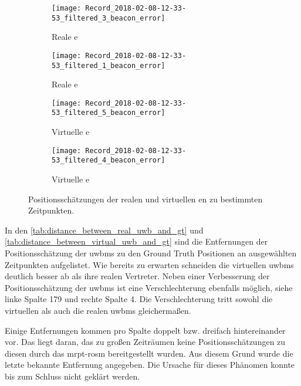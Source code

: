 \begin{figure}
	\centering
	\begin{subfigure}{0.49\linewidth}
		\centering
		\texttt{[image: Record\_2018-02-08-12-33-53\_filtered\_3\_beacon\_error]}
		\caption{Reale e}
		\label{fig:Record_2018-02-08-12-33-53_filtered_3_beacon_error}
	\end{subfigure}
	\hfill
	\begin{subfigure}{0.49\linewidth}
		\centering
		\texttt{[image: Record\_2018-02-08-12-33-53\_filtered\_1\_beacon\_error]}
		\caption{Reale e}
		\label{fig:Record_2018-02-08-12-33-53_filtered_1_beacon_error}
	\end{subfigure}
	\par
	\bigskip
	\begin{subfigure}{0.49\linewidth}
		\centering
		\texttt{[image: Record\_2018-02-08-12-33-53\_filtered\_5\_beacon\_error]}
		\caption{Virtuelle e}
		\label{fig:Record_2018-02-08-12-33-53_filtered_5_beacon_error}
	\end{subfigure}
	\hfill
	\begin{subfigure}{0.49\linewidth}
		\centering
		\texttt{[image: Record\_2018-02-08-12-33-53\_filtered\_4\_beacon\_error]}
		\caption{Virtuelle e}
		\label{fig:Record_2018-02-08-12-33-53_filtered_4_beacon_error}
	\end{subfigure}
	\caption{Positionsschätzungen der realen und virtuellen en zu bestimmten Zeitpunkten.}
	\label{fig:Record_2018-02-08-12-33-53_filtered_beacon_error}
\end{figure}

In den \autoref{tab:distance_between_real_uwb_and_gt} und \autoref{tab:distance_between_virtual_uwb_and_gt} sind die Entfernungen der Positionsschätzung der \glspl{uwbm} zu den Ground Truth Positionen an ausgewählten Zeitpunkten aufgelistet. Wie bereits zu erwarten schneiden die virtuellen \glspl{uwbm} deutlich besser ab als ihre realen Vertreter. Neben einer Verbesserung der Positionsschätzung der \glspl{uwbm} ist eine Verschlechterung ebenfalls möglich, siehe linke Spalte 179  und rechte Spalte 4. Die Verschlechterung tritt sowohl die virtuellen als auch die realen \glspl{uwbm} gleichermaßen.

Einige Entfernungen kommen pro Spalte doppelt bzw. dreifach hintereinander vor. Das liegt daran, das zu großen Zeiträumen keine Positionsschätzungen zu diesen  durch das \gls{mrpt}-\gls{rosm} bereitgestellt wurden. Aus diesem Grund wurde die letzte bekannte Entfernung angegeben. Die Ursache für dieses Phänomen konnte bis zum Schluss nicht geklärt werden.

